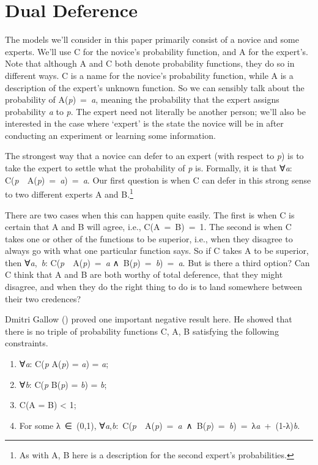 \documentclass[
  12pt,
  letterpaper,
  DIV=11,
  numbers=noendperiod]{scrartcl}
\providecommand{\tightlist}{%
  \setlength{\itemsep}{0pt}\setlength{\parskip}{0pt}}\usepackage{longtable,booktabs,array}
\begin{document}
\section{Dual Deference}\label{sec-gallow}

The models we'll consider in this paper primarily consist of a novice
and some experts. We'll use C for the novice's probability function, and
A for the expert's. Note that although A and C both denote probability
functions, they do so in different ways. C is a name for the novice's
probability function, while A is a description of the expert's unknown
function. So we can sensibly talk about the probability of
A(\emph{p})~=~\emph{a}, meaning the probability that the expert assigns
probability \emph{a} to \emph{p}. The expert need not literally be
another person; we'll also be interested in the case where `expert' is
the state the novice will be in after conducting an experiment or
learning some information.

The strongest way that a novice can defer to an expert (with respect to
\emph{p}) is to take the expert to settle what the probability of
\emph{p} is. Formally, it is that ∀\emph{a}:
C(\emph{p}~\textbar~A(\emph{p})~=~\emph{a})~=~\emph{a}. Our first
question is when C can defer in this strong sense to two different
experts A and B.\footnote{As with A, B here is a description for the
  second expert's probabilities.}

There are two cases when this can happen quite easily. The first is when
C is certain that A and B will agree, i.e., C(A~=~B)~=~1. The second is
when C takes one or other of the functions to be superior, i.e., when
they disagree to always go with what one particular function says. So if
C takes A to be superior, then ∀\emph{a},~\emph{b}:
C(\emph{p}~\textbar~A(\emph{p})~=~\emph{a}
∧~B(\emph{p})~=~\emph{b})~=~\emph{a}. But is there a third option? Can C
think that A and B are both worthy of total deference, that they might
disagree, and when they do the right thing to do is to land somewhere
between their two credences?

Dmitri Gallow () proved one important
negative result here. He showed that there is no triple of probability
functions C, A, B satisfying the following constraints.

\begin{enumerate}
\def\labelenumi{\arabic{enumi}.}
\tightlist
\item
  ∀\emph{a}: C(\emph{p} \textbar{} A(\emph{p}) = \emph{a}) = \emph{a};
\item
  ∀\emph{b}: C(\emph{p} \textbar{} B(\emph{p}) = \emph{b}) = \emph{b};
\item
  C(A = B) \textless{} 1;
\item
  For some λ~∈~(0,1),
  ∀\emph{a},\emph{b}:~C(\emph{p}~\textbar~A(\emph{p})~=~\emph{a}~∧~B(\emph{p})~=~\emph{b})~=~λ\emph{a}~+~(1-λ)\emph{b}.
\end{enumerate}
\end{document}
